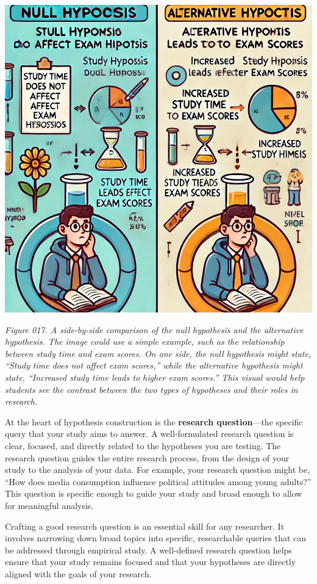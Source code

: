 \documentclass[
]{book}
\begin{document}
\includegraphics[width=1\textwidth,height=\textheight]{images/fig017.jpg}

\emph{Figure 017. A side-by-side comparison of the null hypothesis and the alternative hypothesis. The image could use a simple example, such as the relationship between study time and exam scores. On one side, the null hypothesis might state, ``Study time does not affect exam scores,'' while the alternative hypothesis might state, ``Increased study time leads to higher exam scores.'' This visual would help students see the contrast between the two types of hypotheses and their roles in research.}

At the heart of hypothesis construction is the \textbf{research question}---the specific query that your study aims to answer. A well-formulated research question is clear, focused, and directly related to the hypotheses you are testing. The research question guides the entire research process, from the design of your study to the analysis of your data. For example, your research question might be, ``How does media consumption influence political attitudes among young adults?'' This question is specific enough to guide your study and broad enough to allow for meaningful analysis.

Crafting a good research question is an essential skill for any researcher. It involves narrowing down broad topics into specific, researchable queries that can be addressed through empirical study. A well-defined research question helps ensure that your study remains focused and that your hypotheses are directly aligned with the goals of your research.
\end{document}
